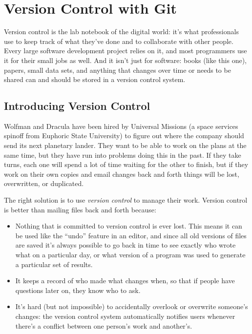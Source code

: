 \documentclass[]{book}
\newcommand{\gdef}[2]{\emph{#2}}
\begin{document}
\chapter{Version Control with Git}\label{version-control-with-git}

Version control is the lab notebook of the digital world: it's what
professionals use to keep track of what they've done and to collaborate
with other people. Every large software development project relies on
it, and most programmers use it for their small jobs as well. And it
isn't just for software: books (like this one), papers, small data sets,
and anything that changes over time or needs to be shared can and should
be stored in a version control system.

\section{Introducing Version Control}

Wolfman and Dracula have been hired by Universal Missions (a space
services spinoff from Euphoric State University) to figure out where the
company should send its next planetary lander. They want to be able to
work on the plans at the same time, but they have run into problems
doing this in the past. If they take turns, each one will spend a lot of
time waiting for the other to finish, but if they work on their own
copies and email changes back and forth things will be lost,
overwritten, or duplicated.

The right solution is to use \gdef{g:version-control}{version
control} to manage their work. Version control is better than mailing
files back and forth because:

\begin{itemize}
\item
  Nothing that is committed to version control is ever lost. This means
  it can be used like the ``undo'' feature in an editor, and since all
  old versions of files are saved it's always possible to go back in
  time to see exactly who wrote what on a particular day, or what
  version of a program was used to generate a particular set of results.
\item
  It keeps a record of who made what changes when, so that if people
  have questions later on, they know who to ask.
\item
  It's hard (but not impossible) to accidentally overlook or overwrite
  someone's changes: the version control system automatically notifies
  users whenever there's a conflict between one person's work and
  another's.
\end{itemize}
\end{document}
